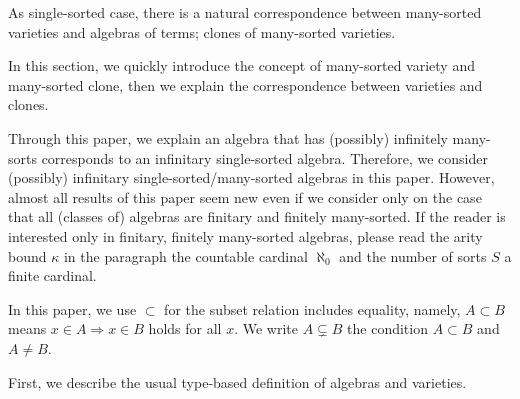 \documentclass[a4paper,10pt]{article}
\theoremstyle{definition}
\begin{document}
As single-sorted case, there is a natural correspondence between 
many-sorted varieties and algebras of terms; clones of many-sorted varieties.

In this section, we quickly introduce the concept of many-sorted variety and
many-sorted clone, then we explain the correspondence between varieties and clones.

Through this paper, we explain an algebra that has (possibly) infinitely
many-sorts corresponds to an infinitary single-sorted algebra.
Therefore, we consider (possibly) infinitary single-sorted/many-sorted
algebras in this paper.
However, almost all results of this paper seem new even if
we consider only on the case that all (classes of) algebras are finitary
and finitely many-sorted.
If the reader is interested only in finitary, finitely
many-sorted algebras, please read the arity bound $\kappa$ in the paragraph
the countable cardinal $\aleph_0$ and the number of sorts $S$ a finite cardinal.

In this paper, we use $\subset$ for the subset relation includes equality,
namely, $A\subset B$ means $x\in A\Rightarrow x\in B$ holds for all $x$.
We write $A\subsetneq B$ the condition $A\subset B$ and $A\neq B$. 

First, we describe the usual type-based definition of algebras and varieties.
\end{document}
